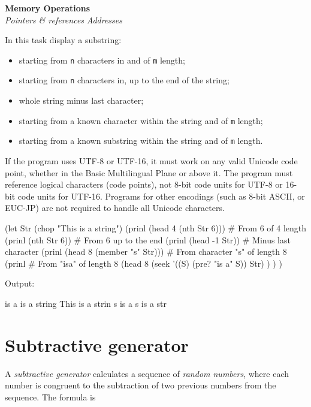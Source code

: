 \begin{itemize}
\textbf{Memory Operations} \\
\emph{Pointers \& references}
\textbar{} \emph{Addresses}

In this task display a substring:

\begin{itemize}
\item
  starting from \texttt{n} characters in and of \texttt{m} length;
\item
  starting from \texttt{n} characters in, up to the end of the string;
\item
  whole string minus last character;
\item
  starting from a known character within the string and of \texttt{m}
  length;
\item
  starting from a known substring within the string and of \texttt{m}
  length.
\end{itemize}

If the program uses UTF-8 or UTF-16, it must work on any valid Unicode
code point, whether in the Basic Multilingual Plane or above it. The
program must reference logical characters (code points), not 8-bit code
units for UTF-8 or 16-bit code units for UTF-16. Programs for other
encodings (such as 8-bit ASCII, or EUC-JP) are not required to handle
all Unicode characters.


\begin{wideverbatim}

(let Str (chop "This is a string")
   (prinl (head 4 (nth Str 6)))        # From 6 of 4 length
   (prinl (nth Str 6))                 # From 6 up to the end
   (prinl (head -1 Str))               # Minus last character
   (prinl (head 8 (member "s" Str)))   # From character "s" of length 8
   (prinl                              # From "isa" of length 8
      (head 8
         (seek '((S) (pre? "is a" S)) Str) ) ) )

Output:

is a
is a string
This is a strin
s is a s
is a str

\end{wideverbatim}

\pagebreak{}
\section*{Subtractive generator}

A \emph{subtractive generator} calculates a sequence of \emph{random
  numbers}, where each number is congruent to the subtraction of two
previous numbers from the sequence. The formula is


\end{itemize}
